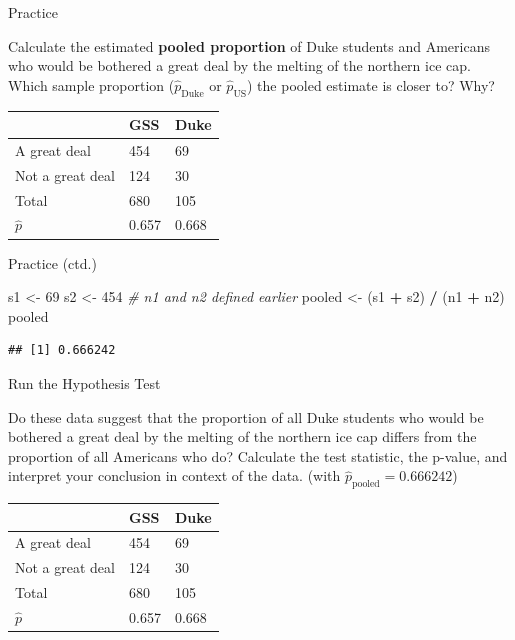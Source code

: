 \documentclass[
  ignorenonframetext,
]{beamer}
\newenvironment{Shaded}{\begin{snugshade}}{\end{snugshade}}
\newcommand{\CommentTok}[1]{\textcolor[rgb]{0.56,0.35,0.01}{\textit{#1}}}
\newcommand{\DecValTok}[1]{\textcolor[rgb]{0.00,0.00,0.81}{#1}}
\newcommand{\NormalTok}[1]{#1}
\newcommand{\OperatorTok}[1]{\textcolor[rgb]{0.81,0.36,0.00}{\textbf{#1}}}
\newcommand{\StringTok}[1]{\textcolor[rgb]{0.31,0.60,0.02}{#1}}
\begin{document}
\begin{frame}{Practice}
\protect\hypertarget{practice-2}{}

Calculate the estimated \textbf{pooled proportion} of Duke students and
Americans who would be bothered a great deal by the melting of the
northern ice cap. Which sample proportion (\(\hat{p}_\text{Duke}\) or
\(\hat{p}_\text{US}\)) the pooled estimate is closer to? Why?

\begin{longtable}[]{@{}lll@{}}
\toprule
\(\;\) & GSS & Duke\tabularnewline
\midrule
\endhead
A great deal & 454 & 69\tabularnewline
Not a great deal & 124 & 30\tabularnewline
Total & 680 & 105\tabularnewline
\(\hat{p}\) & 0.657 & 0.668\tabularnewline
\bottomrule
\end{longtable}

\end{frame}

\begin{frame}[fragile]{Practice (ctd.)}
\protect\hypertarget{practice-ctd.}{}

\begin{Shaded}
\begin{Highlighting}[]
\NormalTok{s1 <-}\StringTok{ }\DecValTok{69}
\NormalTok{s2 <-}\StringTok{ }\DecValTok{454}  \CommentTok{# n1 and n2 defined earlier }
\NormalTok{pooled <-}\StringTok{ }\NormalTok{(s1 }\OperatorTok{+}\StringTok{ }\NormalTok{s2) }\OperatorTok{/}\StringTok{ }\NormalTok{(n1 }\OperatorTok{+}\StringTok{ }\NormalTok{n2)}
\NormalTok{pooled}
\end{Highlighting}
\end{Shaded}

\begin{verbatim}
## [1] 0.666242
\end{verbatim}

\end{frame}

\begin{frame}{Run the Hypothesis Test}
\protect\hypertarget{run-the-hypothesis-test}{}

Do these data suggest that the proportion of all Duke students who would
be bothered a great deal by the melting of the northern ice cap differs
from the proportion of all Americans who do? Calculate the test
statistic, the p-value, and interpret your conclusion in context of the
data. (with \(\hat{p}_\text{pooled} = 0.666242\))

\begin{longtable}[]{@{}lll@{}}
\toprule
\(\;\) & GSS & Duke\tabularnewline
\midrule
\endhead
A great deal & 454 & 69\tabularnewline
Not a great deal & 124 & 30\tabularnewline
Total & 680 & 105\tabularnewline
\(\hat{p}\) & 0.657 & 0.668\tabularnewline
\bottomrule
\end{longtable}

\end{frame}
\end{document}
